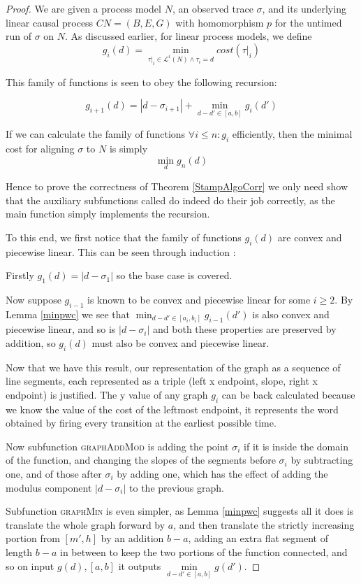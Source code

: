 \documentclass{article}
\theoremstyle{Definition}
\theoremstyle{definition}
\begin{document}
\begin{proof}
	We are given a process model $N$, an observed trace $\sigma$, and its underlying linear causal process $CN = (B, E, G)$ with homomorphism $p$ for the untimed run of $\sigma$ on $N$.
	As discussed earlier, for linear process models, we define $$g_i(d) = \min_{\tau|_i \in \mathcal{L}^i(N) \wedge \tau_i = d} cost(\tau|_i)$$
	
	This family of functions is seen to obey the following recursion: 
	
	$$g_{i+1}(d) = |d - \sigma_{i+1}| + \min_{d-d' \in [a,b]} g_i(d')$$
	
	If we can calculate the family of functions $\forall i \leq n : g_i$ efficiently, then the minimal cost for aligning $\sigma$ to $N$ is simply $$\min_{d} g_n(d)$$
	
	Hence to prove the correctness of Theorem \ref{StampAlgoCorr} we only need show that the auxiliary subfunctions called do indeed do their job correctly, as the main function simply implements the recursion. 
	
	To this end, we first notice that the family of functions $g_i(d)$ are convex and piecewise linear. 
	This can be seen through induction : 
	
	Firstly $g_1(d) = |d - \sigma_1|$ so the base case is covered. 
	
	Now suppose $g_{i-1}$ is known to be convex and piecewise linear for some $i \geq 2$. 
	By Lemma \ref{minpwc} we see that $\min_{d-d' \in [a_i,b_i]} g_{i-1}(d')$  is also convex and piecewise linear, and so is $|d - \sigma_i|$ and both these properties are preserved by addition, so $g_i(d)$ must also be convex and piecewise linear. 
	
	Now that we have this result, our representation of the graph as a sequence of line segments, each represented as a triple (left x endpoint, slope, right x endpoint) is justified. 
	The y value of any graph $g_i$ can be back calculated because we know the value of the cost of the leftmost endpoint, it represents the word obtained by firing every transition at the earliest possible time. 
	
	Now subfunction \textsc{graphAddMod} is adding the point $\sigma_i$ if it is inside the domain of the function, and changing the slopes of the segments before $\sigma_i$ by subtracting one, and of those after $\sigma_i$ by adding one, which has the effect of adding the modulus component $|d - \sigma_i|$ to the previous graph. 
	
	Subfunction \textsc{graphMin} is even simpler, as Lemma \ref{minpwc} suggests all it does is translate the whole graph forward by $a$, and then translate the strictly increasing portion from $[m', h]$ by an addition $b-a$, adding an extra flat segment of length $b-a$ in between to keep the two portions of the function connected, and so on input $g(d), [a, b]$ it outputs $\underset{d-d' \in [a,b]}{\min}g(d')$. 
	

\end{proof}
\end{document}
